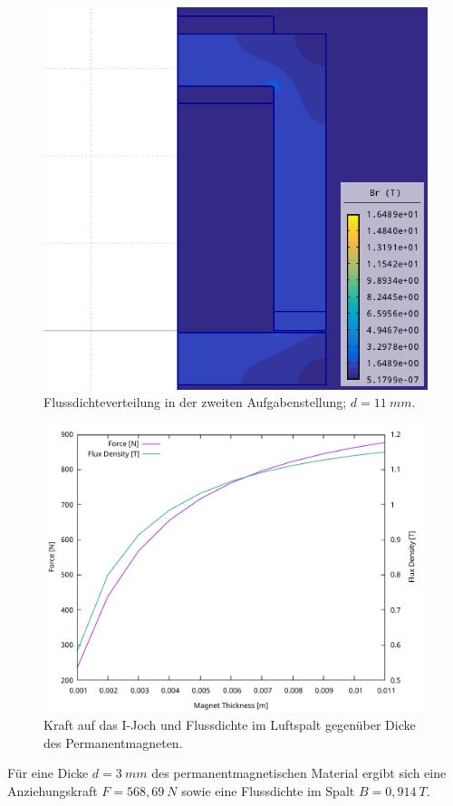 \documentclass[conference,a4paper,twoside]{IEEEtran}
\begin{document}
\begin{figure}
\centerline{\includegraphics[width=0.7\columnwidth]{../assets/assignment_2_simulation.png}}
\caption{Flussdichteverteilung in der zweiten Aufgabenstellung; $d = 11\ mm$.}
\label{assignment_2_simulation}
\end{figure}

\begin{figure}
\centerline{\includegraphics[width=\columnwidth]{../assets/assignment_2_plot.pdf}}
\caption{Kraft auf das I-Joch und Flussdichte im Luftspalt gegenüber Dicke des Permanentmagneten.}
\label{assignment_2_plot}
\end{figure}

Für eine Dicke $d = 3\ mm$ des permanentmagnetischen Material ergibt sich eine Anziehungskraft $F = 568,69\ N$ sowie eine Flussdichte im Spalt $B = 0,914\ T$.
\end{document}

